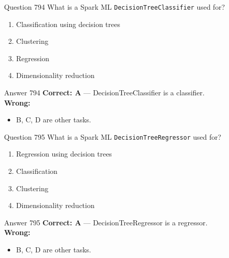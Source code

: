 \documentclass[aspectratio=169,11pt]{beamer}
\begin{document}
	\begin{frame}{Question 794}
		What is a Spark ML \texttt{DecisionTreeClassifier} used for?
		\begin{enumerate}[label=\Alph*.]
			\item Classification using decision trees
			\item Clustering
			\item Regression
			\item Dimensionality reduction
		\end{enumerate}
	\end{frame}
	\begin{frame}{Answer 794}
		\textbf{Correct: A} --- DecisionTreeClassifier is a classifier.\\
		\vspace{0.5em}
		\textbf{Wrong:}
		\begin{itemize}
			\item B, C, D are other tasks.
		\end{itemize}
	\end{frame}
	
	\begin{frame}{Question 795}
		What is a Spark ML \texttt{DecisionTreeRegressor} used for?
		\begin{enumerate}[label=\Alph*.]
			\item Regression using decision trees
			\item Classification
			\item Clustering
			\item Dimensionality reduction
		\end{enumerate}
	\end{frame}
	\begin{frame}{Answer 795}
		\textbf{Correct: A} --- DecisionTreeRegressor is a regressor.\\
		\vspace{0.5em}
		\textbf{Wrong:}
		\begin{itemize}
			\item B, C, D are other tasks.
		\end{itemize}
	\end{frame}
	
\end{document}
